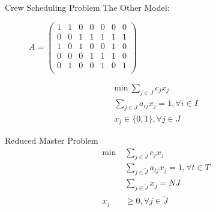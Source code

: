 \documentclass{beamer}
\begin{document}
\begin{frame}{Crew Scheduling Problem}
The Other Model:
    \begin{figure}[!htb]
        \centering
        \begin{minipage}{0.48\textwidth}
            $A = \begin{pmatrix}
                1 & 1 & 0 & 0 & 0 & 0 & 0 \\
                0 & 0 & 1 & 1 & 1 & 1 & 1 \\
                1 & 0 & 1 & 0 & 0 & 1 & 0 \\
                0 & 0 & 0 & 1 & 1 & 1 & 0 \\
                0 & 1 & 0 & 0 & 1 & 0 & 1 \\
            \end{pmatrix}$
        \end{minipage}
%
        \begin{minipage}{.48\textwidth}
            \begin{subequations}
                \label{spppp}
                \begin{align}
                \label{spp2}  \text{min} \: \sum_{j \in J} c_j x_j \\
                \label{spp22} \sum_{j \in J} a_{ij} x_j = 1, \forall i \in I \\
                \label{spp24} x_j \in \{0, 1\}, \forall j \in J
            \end{align}
        \end{subequations}
        \end{minipage}
    \end{figure}
\end{frame}

\begin{frame}{Reduced Master Problem}
    \begin{subequations}
        \label{pmaster}
        \begin{align}
            \label{pmaster1}  \text{min} \: &\sum_{j \in \tilde{J}} c_j x_j \\
            \label{pmaster2} &\sum_{j \in \tilde{J}} a_{tj} x_j = 1, \forall t \in T \\
            \label{pmaster3} &\sum_{j \in \tilde{J}}        x_j = NJ \\
            \label{pmaster4} x_j &\geq 0, \forall j \in \tilde{J}
        \end{align}
    \end{subequations}
\end{frame}
\end{document}
